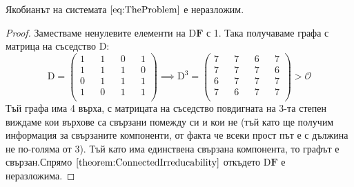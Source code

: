 \begin{proposition}
  Якобианът на системата $\ref{eq:TheProblem}$ е неразложим.
\end{proposition}
\begin{proof}
  Заместваме ненулевите елементи на $\mathrm{D} \mathbf{F}$ с 1. Така получаваме графа с матрица на съседство $\mathrm{D}$:
  \begin{equation}
    \mathrm{D} =
    \begin{pmatrix}
      1 && 1 && 0 && 1 \\
      1 && 1 && 1 && 0 \\
      0 && 1 && 1 && 1 \\
      1 && 0 && 1 && 1 \\
    \end{pmatrix}
    \implies
    \mathrm{D}^3 =
    \begin{pmatrix}
      7 && 7 && 6 && 7 \\
      7 && 7 && 7 && 6 \\
      6 && 7 && 7 && 7 \\
      7 && 6 && 7 && 7 \\
    \end{pmatrix}
    >
    \mathscr{O}
  \end{equation}
  Тъй графа има 4 върха, с матрицата на съседство повдигната на 3-та степен виждаме кои върхове са свързани помежду си и кои не (тъй като ще получим информация за свързаните компоненти, от факта че всеки прост път е с дължина не по-голяма от 3). Тъй като има единствена свързана компонента, то графът е свързан.Спрямо $\ref{theorem:ConnectedIrreducability}$ откъдето $\mathrm{D}\mathbf{F}$ е неразложима.
  \end{proof}

